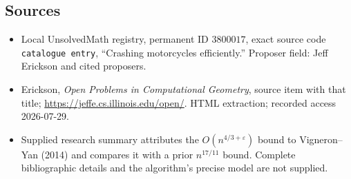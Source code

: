 \documentclass[11pt]{article}
\begin{document}
\subsection{Sources}
\begin{itemize}
\item Local UnsolvedMath registry, permanent ID \(3800017\), exact source code \texttt{catalogue entry}, ``Crashing motorcycles efficiently.'' Proposer field: Jeff Erickson and cited proposers.
\item Erickson, \emph{Open Problems in Computational Geometry}, source item with that title; \url{https://jeffe.cs.illinois.edu/open/}. HTML extraction; recorded access 2026-07-29.
\item Supplied research summary attributes the \(O(n^{4/3+\varepsilon})\) bound to Vigneron--Yan (2014) and compares it with a prior \(n^{17/11}\) bound. Complete bibliographic details and the algorithm's precise model are not supplied.
\end{itemize}
\end{document}

